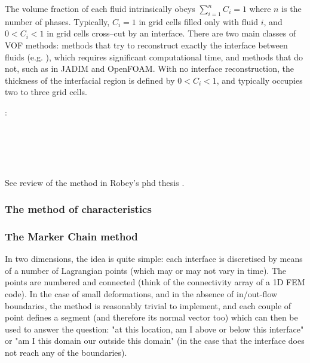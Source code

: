 The volume fraction of each fluid intrinsically obeys $\sum \limits_{{i=1}}^n C_i = 1$ where $n$ is the number of phases. 
Typically, $C_i=1$ in grid cells filled only with fluid $i$, and $0<C_i<1$ in grid cells cross--cut by an interface. 
There are two main classes of VOF methods: methods that try to reconstruct exactly the interface between fluids (e.g. \cite{puth18}), which requires significant computational time, and methods that do not, such as in JADIM and OpenFOAM. 
With no interface reconstruction, the thickness of the interfacial region is defined by $0<C_i<1$, and typically occupies two to three grid cells. 

\Literature:\\
\textcite{hini81}\\
\textcite{dusm13}\\
\textcite{ropu19}\\
\textcite{logb20}\\
\textcite{lobg22}\\

See review of the method in Robey's phd thesis \cite{robe19}.

\subsubsection{The method of characteristics}


\cite{devv00a}

\subsubsection{The Marker Chain method}

In two dimensions, the idea is quite simple: each interface is discretised by means of a number
of Lagrangian points (which may or may not vary in time). The points are numbered and 
connected (think of the connectivity array of a 1D FEM code). In the case of small deformations, 
and in the absence of in/out-flow boundaries, the method is reasonably trivial to implement, and 
each couple of point defines a segment (and therefore its normal vector too) which can then be used
to answer the question: "at this location, am I above or below this interface" or "am I this domain our
outside this domain" (in the case that the interface does not reach any of the boundaries).

